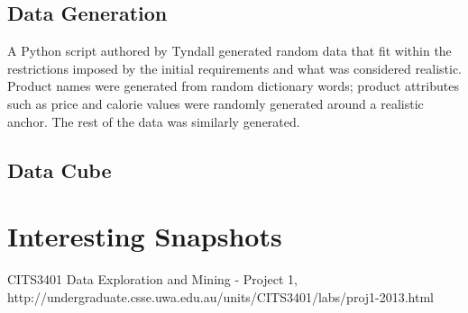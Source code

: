 \documentclass[12pt, a4paper]{article}
\begin{document}
\subsection*{Data Generation}

A Python script authored by Tyndall generated random data that fit within the restrictions imposed by the initial requirements and what was considered realistic. Product names were generated from random dictionary words; product attributes such as price and calorie values were randomly generated around a realistic anchor. The rest of the data was similarly generated.

\subsection*{Data Cube}

\section*{Interesting Snapshots}



\begin{thebibliography}{9}

	CITS3401 Data Exploration and Mining - Project 1,
	http://undergraduate.csse.uwa.edu.au/units/CITS3401/labs/proj1-2013.html
		
\end{thebibliography}


\end{document}
